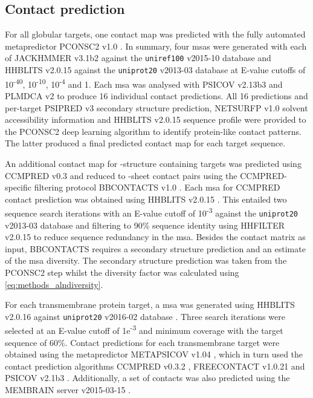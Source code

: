\subsection{Contact prediction} \label{sec:ample_proof_conpred}
For all globular targets, one contact map was predicted with the fully automated metapredictor PCONSC2 v1.0 \cite{Skwark2014-qp}. In summary, four \gls{msa}s were generated with each of JACKHMMER v3.1b2 \cite{Johnson2010-uz} against the \texttt{uniref100} v2015-10 database and HHBLITS v2.0.15 \cite{Remmert2011-kt} against the \texttt{uniprot20} v2013-03 database \cite{Bateman2017-pb} at E-value cutoffs of 10\textsuperscript{-40}, 10\textsuperscript{-10}, 10\textsuperscript{-4} and 1. Each \gls{msa} was analysed with PSICOV v2.13b3 \cite{Jones2012-ks} and PLMDCA v2 \cite{Ekeberg2014-kf} to produce 16 individual contact predictions. All 16 predictions and per-target PSIPRED v3 \cite{Jones1999-ed} secondary structure prediction, NETSURFP v1.0 \cite{Petersen2009-wy} solvent accessibility information and HHBLITS v2.0.15 \cite{Remmert2011-kt} sequence profile were provided to the PCONSC2 deep learning algorithm \cite{Skwark2014-qp} to identify protein-like contact patterns. The latter produced a final predicted contact map for each target sequence.

An additional contact map for \textbeta-structure containing targets was predicted using CCMPRED v0.3 \cite{Seemayer2014-zp} and reduced to \textbeta-sheet contact pairs using the CCMPRED-specific filtering protocol BBCONTACTS v1.0 \cite{Andreani2015-qn}. Each \gls{msa} for CCMPRED contact prediction was obtained using HHBLITS v2.0.15 \cite{Remmert2011-kt}. This entailed two sequence search iterations with an E-value cutoff of 10\textsuperscript{-3} against the \texttt{uniprot20} v2013-03 database \cite{Bateman2017-pb} and filtering to 90\% sequence identity using HHFILTER v2.0.15 \cite{Remmert2011-kt} to reduce sequence redundancy in the \gls{msa}. Besides the contact matrix as input, BBCONTACTS requires a secondary structure prediction and an estimate of the \gls{msa} diversity. The secondary structure prediction was taken from the PCONSC2 step whilst the diversity factor was calculated using \cref{eq:methods_alndiversity}.

For each transmembrane protein target, a \gls{msa} was generated using HHBLITS v2.0.16 \cite{Remmert2011-kt} against \texttt{uniprot20} v2016-02 database \cite{Bateman2017-pb}. Three search iterations were selected at an E-value cutoff of 1e\textsuperscript{-3} and minimum coverage with the target sequence of 60\%. Contact predictions for each transmembrane target were obtained using the metapredictor METAPSICOV v1.04 \cite{Jones2015-vq}, which in turn used the contact prediction algorithms CCMPRED v0.3.2 \cite{Seemayer2014-zp}, FREECONTACT v1.0.21 \cite{Kajan2014-bx} and PSICOV v2.1b3 \cite{Jones2012-ks}. Additionally, a set of contacts was also predicted using the MEMBRAIN server v2015-03-15 \cite{Yang2013-bf}.

